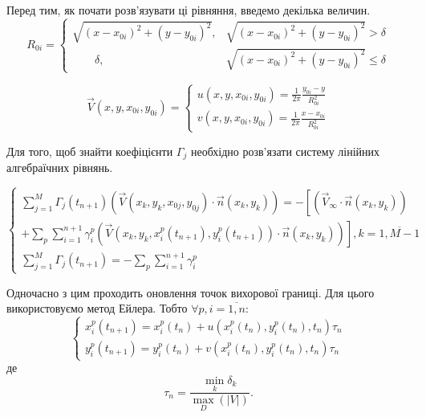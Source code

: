 \documentclass[a4paper,12pt]{article}
\begin{document}
	Перед тим, як почати розв'язувати ці рівняння, введемо декілька величин.
	\begin{equation*}
	R_{0i} = 
	\begin{cases}
	\sqrt{ (x - x_{0i})^2 + (y - y_{0i})^2 }, &\sqrt{ (x - x_{0i})^2 + (y - y_{0i})^2 } > \delta
	\\
	\qquad \delta, &\sqrt{ (x - x_{0i})^2 + (y - y_{0i})^2 } \le \delta
	\end{cases}
	\end{equation*}
	
	\begin{equation*}
	\vec{V}(x,y,x_{0i}, y_{0i}) =
	\begin{cases}
	u(x,y,x_{0i}, y_{0i}) = \frac{1}{2 \pi} \frac{y_{0i} - y}{R_{0i}^2}
	\\
	v(x,y,x_{0i}, y_{0i}) = \frac{1}{2 \pi} \frac{x - x_{0i} }{R_{0i}^2}
	\end{cases}
	\end{equation*}
	
	Для того, щоб знайти коефіцієнти $\Gamma_{j}$ необхідно розв'язати систему лінійних алгебраїчних рівнянь.
	
	\begin{equation*}
	\begin{cases}
	\sum_{j=1}^{M} \Gamma_{j}(t_{n+1})\left( \vec{V}(x_k,y_k, x_{0j}, y_{0j}) \cdot \vec{n}(x_k,y_k) \right) = - \left[ \left(  \vec{V}_{\infty} \cdot \vec{n}(x_k, y_k) \right) \right.
	\\
	+ \left. \sum_p \sum_{i=1}^{n+1} \gamma_{i}^{p} \left( \vec{V}(x_k,y_k,x_{i}^{p}(t_{n+1}), y_{i}^{p}(t_{n+1})) \cdot \vec{n}(x_k, y_k) \right)\right], k = \overline{1,M-1}
	\\
	\sum_{j=1}^{M} \Gamma_{j}(t_{n+1}) = - \sum_p \sum_{i=1}^{n+1} \gamma_{i}^{p}
	\end{cases}
	\end{equation*}
	
	Одночасно з цим проходить оновлення точок вихорової границі. Для цього використовуємо метод Ейлера. Тобто $\forall p, i = \overline{1,n}$:
	\begin{equation*}
	\begin{cases}
	x_{i}^{p}(t_{n+1}) = x_{i}^{p}(t_n) + u(x_{i}^{p}(t_n), y_{i}^{p}(t_n), t_n)\tau_n
	\\
	y_{i}^{p}(t_{n+1}) = y_{i}^{p}(t_n) + v(x_{i}^{p}(t_n), y_{i}^{p}(t_n), t_n)\tau_n
	\end{cases}
	\end{equation*}
	де $$\tau_n = \frac{\min_{k} \delta_k}{\max_{D}(|V|)}.$$
	
\end{document}

